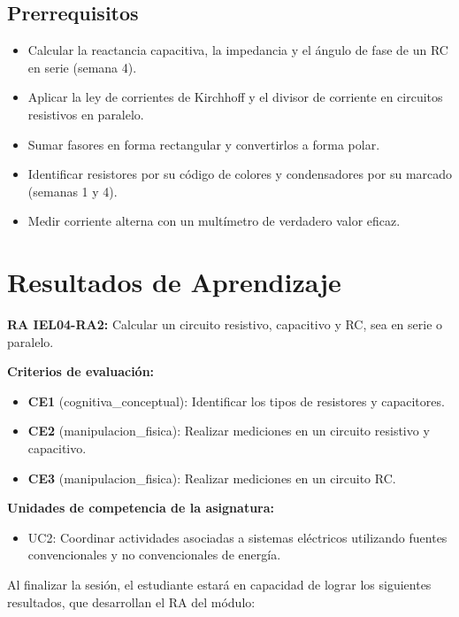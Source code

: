 \documentclass[11pt,letterpaper]{article}
\begin{document}
\subsection{Prerrequisitos}

\begin{itemize}
  \item Calcular la reactancia capacitiva, la impedancia y el ángulo de fase de un RC en serie (semana 4).
  \item Aplicar la ley de corrientes de Kirchhoff y el divisor de corriente en circuitos resistivos en paralelo.
  \item Sumar fasores en forma rectangular y convertirlos a forma polar.
  \item Identificar resistores por su código de colores y condensadores por su marcado (semanas 1 y 4).
  \item Medir corriente alterna con un multímetro de verdadero valor eficaz.
\end{itemize}

\section{Resultados de Aprendizaje}

\begin{alineacion}
\textbf{RA IEL04-RA2:} Calcular un circuito resistivo, capacitivo y RC, sea en serie o paralelo.

\textbf{Criterios de evaluación:}

\begin{itemize}
  \item \textbf{CE1} (cognitiva\_conceptual): Identificar los tipos de resistores y capacitores.
  \item \textbf{CE2} (manipulacion\_fisica): Realizar mediciones en un circuito resistivo y capacitivo.
  \item \textbf{CE3} (manipulacion\_fisica): Realizar mediciones en un circuito RC.
\end{itemize}

\textbf{Unidades de competencia de la asignatura:}

\begin{itemize}
  \item UC2: Coordinar actividades asociadas a sistemas eléctricos utilizando fuentes convencionales y no convencionales de energía.
\end{itemize}
\end{alineacion}

Al finalizar la sesión, el estudiante estará en capacidad de lograr los siguientes resultados, que desarrollan el RA del módulo:
\end{document}
